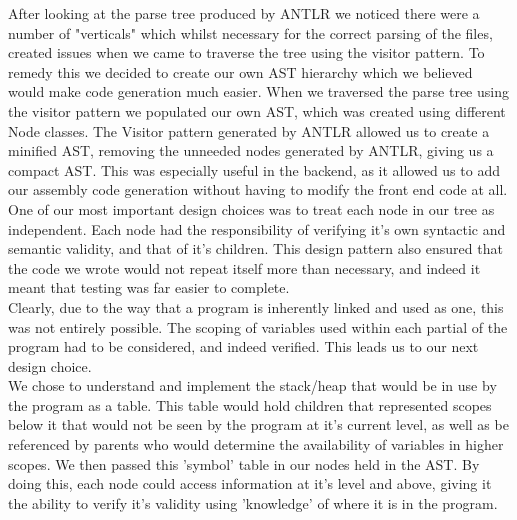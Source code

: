 \documentclass[a4paper, 11pt]{article} %
\begin{document}


After looking at the parse tree produced by ANTLR we noticed there were a number of "verticals" which whilst necessary for the correct parsing of the files, created issues when we came to traverse the tree using the visitor pattern. To remedy this we decided to create our own AST hierarchy which we believed would make code generation much easier. When we traversed the parse tree using the visitor pattern we populated our own AST, which was created using different Node classes. The Visitor pattern generated by ANTLR allowed us to create a minified AST, removing the unneeded nodes generated by ANTLR, giving us a compact AST. This was especially useful in the backend, as it allowed us to add our assembly code generation without having to modify the front end code at all. \\

One of our most important design choices was to treat each node in our tree as independent. Each node had the responsibility of verifying it's own syntactic and semantic validity, and that of it's children. This design pattern also ensured that the code we wrote would not repeat itself more than necessary, and indeed it meant that testing was far easier to complete. \\
Clearly, due to the way that a program is inherently linked and used as one, this was not entirely possible. The scoping of variables used within each partial of the program had to be considered, and indeed verified. This leads us to our next design choice. \\

We chose to understand and implement the stack/heap that would be in use by the program as a table. This table would hold children that represented scopes below it that would not be seen by the program at it's current level, as well as be referenced by parents who would determine the availability of variables in higher scopes. We then passed this 'symbol' table in our nodes held in the AST. By doing this, each node could access information at it's level and above, giving it the ability to verify it's validity using 'knowledge' of where it is in the program. 

\end{document}
